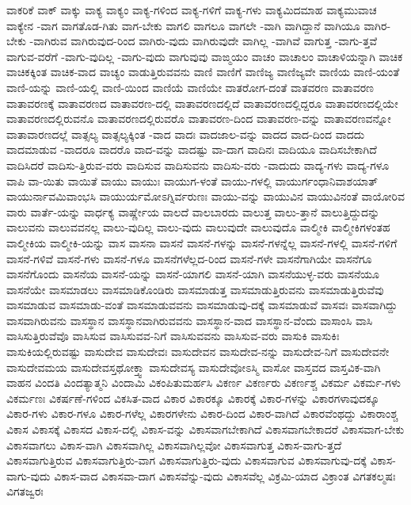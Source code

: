 {ವಾಕರಿಕೆ
ವಾಕ್
ವಾಕ್ಕು
ವಾಕ್ಯ
ವಾಕ್ಯಂ
ವಾಕ್ಯ-ಗಳಿಂದ
ವಾಕ್ಯ-ಗಳಿಗೆ
ವಾಕ್ಯ-ಗಳು
ವಾಕ್ಯಮಿದಮಾಹ
ವಾಕ್ಯಮುವಾಚ
ವಾಕ್ಯೇನ
-ವಾಗ
ವಾಗತೊಡ-ಗಿತು
ವಾಗ-ಬೇಕು
ವಾಗಲಿ
ವಾಗಲೂ
ವಾಗಲೇ
-ವಾಗಿ
ವಾಗಿದ್ದಾನೆ
ವಾಗಿಯೂ
ವಾಗಿರ-ಬೇಕು
-ವಾಗಿರುವ
ವಾಗಿರುವುದ-ರಿಂದ
ವಾಗಿರು-ವುದು
ವಾಗಿರುವುದೇ
ವಾಗಿಲ್ಲ
-ವಾಗಿವೆ
ವಾಗುತ್ತ
-ವಾಗು-ತ್ತವೆ
ವಾಗುವ-ವರೆಗೆ
-ವಾಗು-ವುದಿಲ್ಲ
-ವಾಗು-ವುದು
ವಾಗುವುವು
ವಾಙ್ಮಯಂ
ವಾಚಂ
ವಾಚಾಲಂ
ವಾಚಾಳಿಯನ್ನಾಗಿ
ವಾಚಿಕ
ವಾಚಿಕಕ್ಕಿಂತ
ವಾಚಿಕ-ವಾದ
ವಾಚ್ಯಂ
ವಾಡುತ್ತಿರುವವನು
ವಾಣಿ
ವಾಣಿಗೆ
ವಾಣಿಜ್ಯ
ವಾಣಿಜ್ಯವೇ
ವಾಣಿಯ
ವಾಣಿ-ಯಂತೆ
ವಾಣಿ-ಯನ್ನು
ವಾಣಿ-ಯಲ್ಲಿ
ವಾಣಿ-ಯಿಂದ
ವಾಣಿಯೆ
ವಾಣಿಯೇ
ವಾತರೋಗ-ದಂತೆ
ವಾತವರಣ
ವಾತಾವರಣ
ವಾತಾವರಣಕ್ಕೆ
ವಾತಾವರಣದ
ವಾತಾವರಣ-ದಲ್ಲಿ
ವಾತಾವರಣದಲ್ಲಿದೆ
ವಾತಾವರಣದಲ್ಲಿದ್ದರೂ
ವಾತಾವರಣದಲ್ಲಿಯೇ
ವಾತಾವರಣದಲ್ಲಿರುವನೊ
ವಾತಾವರಣದಲ್ಲಿರುವರೊ
ವಾತಾವರಣ-ದಿಂದ
ವಾತಾವರಣ-ವನ್ನು
ವಾತಾವರಣವನ್ನೋ
ವಾತಾವಾರಣದಲ್ಲೆ
ವಾತ್ಸಲ್ಯ
ವಾತ್ಸಲ್ಯಕ್ಕಿಂತ
-ವಾದ
ವಾದಃ
ವಾದಜಾಲ-ವನ್ನು
ವಾದದ
ವಾದ-ದಿಂದ
ವಾದದು
ವಾದಮಾಡುವ
-ವಾದರೂ
ವಾದರೊ
ವಾದ-ವನ್ನು
ವಾದಷ್ಟು
ವಾ-ದಾಗ
ವಾದಿನಃ
ವಾದಿಯೂ
ವಾದಿಸಬೇಕಾಗಿದೆ
ವಾದಿಸಿದರೆ
ವಾದಿಸು-ತ್ತಿರುವ-ವರು
ವಾದಿಸುವ
ವಾದಿಸುವನು
ವಾದಿಸು-ವರು
-ವಾದುದು
ವಾದ್ಯ-ಗಳು
ವಾದ್ಯ-ಗಳೂ
ವಾಪಿ
ವಾ-ಯಿತು
ವಾಯಿತೆ
ವಾಯು
ವಾಯುಃ
ವಾಯುಗ-ಳಂತೆ
ವಾಯು-ಗಳಲ್ಲಿ
ವಾಯುರ್ಗಂಧಾನಿವಾಶಯಾತ್
ವಾಯುರ್ನಾವಮಿವಾಂಭಸಿ
ವಾಯುರ್ಯಮೋಽಗ್ನಿರ್ವರುಣಃ
ವಾಯು-ವನ್ನು
ವಾಯುವಿನ
ವಾಯುವಿನಂತೆ
ವಾಯೋರಿವ
ವಾರು
ವಾರ್ತೆ-ಯನ್ನು
ವಾರ್ಧಕ್ಯ
ವಾರ್ಷ್ಣೇಯ
ವಾಲದೆ
ವಾಲಬಾರದು
ವಾಲುತ್ತ
ವಾಲು-ತ್ತಾನೆ
ವಾಲುತ್ತಿದ್ದುದನ್ನು
ವಾಲುವನು
ವಾಲುವವನಲ್ಲ
ವಾಲು-ವುದಿಲ್ಲ
ವಾಲು-ವುದು
ವಾಲುವುದೇ
ವಾಲುವುದೊ
ವಾಲ್ಮೀಕಿ
ವಾಲ್ಮೀಕಿಗಳಂತಹ
ವಾಲ್ಮೀಕಿಯ
ವಾಲ್ಮೀಕಿ-ಯನ್ನು
ವಾಸ
ವಾಸನಾ
ವಾಸನೆ
ವಾಸನೆ-ಗಳನ್ನು
ವಾಸನೆ-ಗಳನ್ನೆಲ್ಲ
ವಾಸನೆ-ಗಳಲ್ಲಿ
ವಾಸನೆ-ಗಳಿಗೆ
ವಾಸನೆ-ಗಳಿವೆ
ವಾಸನೆ-ಗಳು
ವಾಸನೆ-ಗಳೂ
ವಾಸನೆಗಳೆಲ್ಲದ-ರಿಂದ
ವಾಸನೆ-ಗಳೇ
ವಾಸನೆಗಾಗಿಯೇ
ವಾಸನೆಗೂ
ವಾಸನೆಗೊಂದು
ವಾಸನೆಯ
ವಾಸನೆ-ಯನ್ನು
ವಾಸನೆ-ಯಾಗಲಿ
ವಾಸನೆ-ಯಾಗಿ
ವಾಸನೆಯುಳ್ಳ-ವರು
ವಾಸನೆಯೂ
ವಾಸನೆಯೇ
ವಾಸಮಾಡಲು
ವಾಸಮಾಡಿಕೊಂಡಿರು
ವಾಸಮಾಡುತ್ತ
ವಾಸಮಾಡುತ್ತಿರುವನು
ವಾಸಮಾಡುತ್ತಿರುವೆವು
ವಾಸಮಾಡುವ
ವಾಸಮಾಡು-ವಂತೆ
ವಾಸಮಾಡುವವನು
ವಾಸಮಾಡುವು-ದಕ್ಕೆ
ವಾಸಮಾಡುವೆ
ವಾಸವಃ
ವಾಸವಾಗಿದ್ದು
ವಾಸವಾಗಿರುವನು
ವಾಸಸ್ಥಾನ
ವಾಸಸ್ಥಾನವಾಗಿರುವವನು
ವಾಸಸ್ಥಾನ-ವಾದ
ವಾಸಸ್ಥಾನ-ವೆಂದು
ವಾಸಾಂಸಿ
ವಾಸಿ
ವಾಸಿಸುತ್ತಿರುವೆವೊ
ವಾಸಿಸುವ
ವಾಸಿಸುವವ-ನಿಗೆ
ವಾಸಿಸುವವನು
ವಾಸಿಸುವ-ವರು
ವಾಸುಕಿ
ವಾಸುಕಿಃ
ವಾಸುಕಿಯಲ್ಲಿರುವಷ್ಟು
ವಾಸುದೇವ
ವಾಸುದೇವಃ
ವಾಸುದೇವನ
ವಾಸುದೇವ-ನನ್ನು
ವಾಸುದೇವ-ನಿಗೆ
ವಾಸುದೇವನೇ
ವಾಸುದೇವಮಯ
ವಾಸುದೇವಸ್ತಥೋಕ್ತ್ವಾ
ವಾಸುದೇವಸ್ಯ
ವಾಸುದೇವೋಽಸ್ಮಿ
ವಾಸೋ
ವಾಸ್ತವದ
ವಾಸ್ತವಿಕ-ವಾಗಿ
ವಾಹನ
ವಿಂದತಿ
ವಿಂದತ್ಯಾತ್ಮನಿ
ವಿಂದಾಮಿ
ವಿಕಂಪಿತುಮರ್ಹಸಿ
ವಿಕರ್ಣ
ವಿಕರ್ಣರು
ವಿಕರ್ಣಶ್ಚ
ವಿಕರ್ಮ
ವಿಕರ್ಮ-ಗಳು
ವಿಕರ್ಮಣಃ
ವಿಕರ್ಷಣೆ-ಗಳಿಂದ
ವಿಕಸಿತ-ವಾದ
ವಿಕಾರ
ವಿಕಾರಕ್ಕೂ
ವಿಕಾರಕ್ಕೆ
ವಿಕಾರ-ಗಳನ್ನು
ವಿಕಾರಗಳಾವುದಕ್ಕೂ
ವಿಕಾರ-ಗಳು
ವಿಕಾರ-ಗಳೂ
ವಿಕಾರ-ಗಳೆಲ್ಲ
ವಿಕಾರಗಳೇನು
ವಿಕಾರ-ದಿಂದ
ವಿಕಾರ-ವಾಗಿದೆ
ವಿಕಾರವೆಂಥದ್ದು
ವಿಕಾರಾಂಶ್ಚ
ವಿಕಾಸ
ವಿಕಾಸಕ್ಕೆ
ವಿಕಾಸದ
ವಿಕಾಸ-ದಲ್ಲಿ
ವಿಕಾಸ-ವನ್ನು
ವಿಕಾಸವಾಗಬೇಕಾಗಿದೆ
ವಿಕಾಸವಾಗಬೇಕಾದರೆ
ವಿಕಾಸವಾಗ-ಬೇಕು
ವಿಕಾಸವಾಗಲು
ವಿಕಾಸ-ವಾಗಿ
ವಿಕಾಸವಾಗಿಲ್ಲ
ವಿಕಾಸವಾಗಿಲ್ಲವೋ
ವಿಕಾಸವಾಗುತ್ತ
ವಿಕಾಸ-ವಾಗು-ತ್ತದೆ
ವಿಕಾಸವಾಗುತ್ತಿರುವ
ವಿಕಾಸವಾಗುತ್ತಿರು-ವಾಗ
ವಿಕಾಸವಾಗುತ್ತಿರು-ವುದು
ವಿಕಾಸವಾಗುವ
ವಿಕಾಸವಾಗುವು-ದಕ್ಕೆ
ವಿಕಾಸ-ವಾಗು-ವುದು
ವಿಕಾಸ-ವಾದ
ವಿಕಾಸವಾ-ದಾಗ
ವಿಕಾಸವೆನ್ನು-ವುದು
ವಿಕಾಸವೆಲ್ಲ
ವಿಕ್ರಮಿ-ಯಾದ
ವಿಕ್ರಾಂತ
ವಿಗತಕಲ್ಮಷಃ
ವಿಗತಜ್ವರಃ
}
